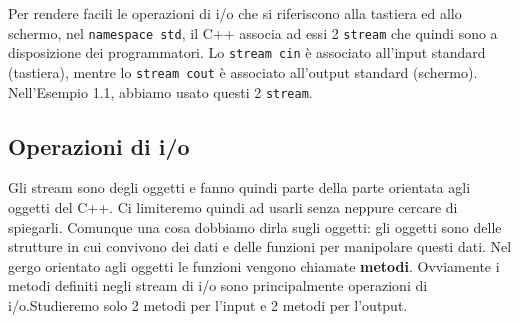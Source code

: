 \documentclass[a4paper,12pt]{book}
\begin{document}
Per rendere facili le operazioni di i/o che si riferiscono alla tastiera ed allo schermo, nel \texttt{namespace std}, il C++ associa ad essi 2 \texttt{stream} che quindi sono a disposizione dei programmatori.
Lo \texttt{stream cin} è associato all'input standard (tastiera), mentre lo \texttt{stream cout} è associato all'output standard (schermo).
Nell'Esempio 1.1, abbiamo usato questi 2 \texttt{stream}. 

\subsection{Operazioni di i/o}
Gli stream sono degli oggetti e fanno quindi parte della parte orientata agli oggetti del C++.
Ci limiteremo quindi ad usarli senza neppure cercare di spiegarli.
Comunque una cosa dobbiamo dirla sugli oggetti: gli oggetti sono delle strutture in cui convivono dei dati e delle funzioni per manipolare questi dati.
Nel gergo orientato agli oggetti le funzioni vengono chiamate \textbf{metodi}. Ovviamente i metodi definiti negli stream di i/o sono principalmente operazioni di i/o.Studieremo solo 2 metodi per l'input e 2 metodi per l'output.
\end{document}
